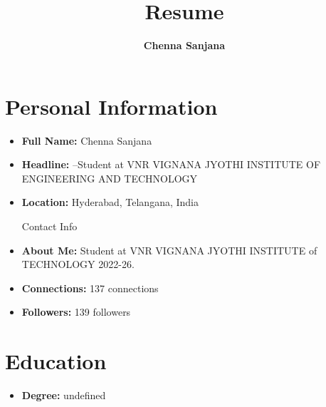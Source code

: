 \documentclass[a4paper, 12pt]{article}
\begin{document}
    \title{\textbf{Resume}}
    \author{\textbf{Chenna Sanjana}}
    \date{}
    \maketitle


    \section*{Personal Information}
    \begin{itemize}
        \item \textbf{Full Name:} Chenna Sanjana
        \item \textbf{Headline:} --Student at VNR VIGNANA JYOTHI INSTITUTE OF ENGINEERING AND TECHNOLOGY
        \item \textbf{Location:} Hyderabad, Telangana, India
          
            Contact Info
        \item \textbf{About Me:} Student at VNR VIGNANA JYOTHI INSTITUTE of TECHNOLOGY 2022-26.
        \item \textbf{Connections:} 137 connections
        \item \textbf{Followers:} 139 followers
    \end{itemize}

    \section*{Education}
    \begin{itemize}
        \item \textbf{Degree:} undefined
        \end{itemize}

    
\end{document}
